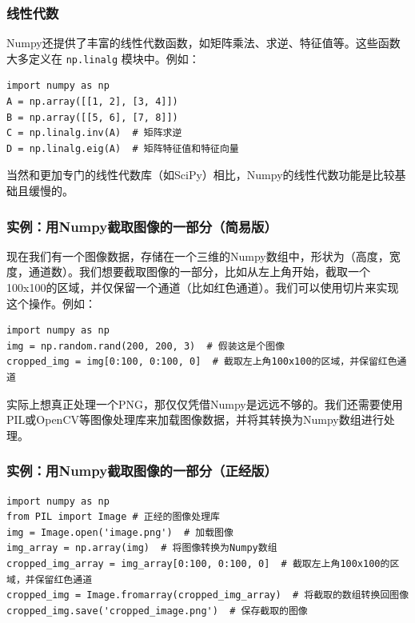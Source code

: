 \begin{frame}[fragile]
    \frametitle{线性代数}

    Numpy还提供了丰富的线性代数函数，如矩阵乘法、求逆、特征值等。这些函数大多定义在 \texttt{np.linalg} 模块中。例如：
    \begin{verbatim}
import numpy as np
A = np.array([[1, 2], [3, 4]])
B = np.array([[5, 6], [7, 8]])
C = np.linalg.inv(A)  # 矩阵求逆
D = np.linalg.eig(A)  # 矩阵特征值和特征向量
    \end{verbatim}
    当然和更加专门的线性代数库（如SciPy）相比，Numpy的线性代数功能是比较基础且缓慢的。

\end{frame}

\begin{frame}[fragile]
    \frametitle{实例：用Numpy截取图像的一部分（简易版）}

    现在我们有一个图像数据，存储在一个三维的Numpy数组中，形状为（高度，宽度，通道数）。我们想要截取图像的一部分，比如从左上角开始，截取一个100x100的区域，并仅保留一个通道（比如红色通道）。我们可以使用切片来实现这个操作。例如：
    \begin{verbatim}
import numpy as np
img = np.random.rand(200, 200, 3)  # 假装这是个图像
cropped_img = img[0:100, 0:100, 0]  # 截取左上角100x100的区域，并保留红色通道
    \end{verbatim}

    实际上想真正处理一个PNG，那仅仅凭借Numpy是远远不够的。我们还需要使用PIL或OpenCV等图像处理库来加载图像数据，并将其转换为Numpy数组进行处理。

\end{frame}

\begin{frame}[fragile]
    \frametitle{实例：用Numpy截取图像的一部分（正经版）}

    \begin{verbatim}
import numpy as np
from PIL import Image # 正经的图像处理库
img = Image.open('image.png')  # 加载图像
img_array = np.array(img)  # 将图像转换为Numpy数组
cropped_img_array = img_array[0:100, 0:100, 0]  # 截取左上角100x100的区域，并保留红色通道
cropped_img = Image.fromarray(cropped_img_array)  # 将截取的数组转换回图像
cropped_img.save('cropped_image.png')  # 保存截取的图像
    \end{verbatim}
\end{frame}


